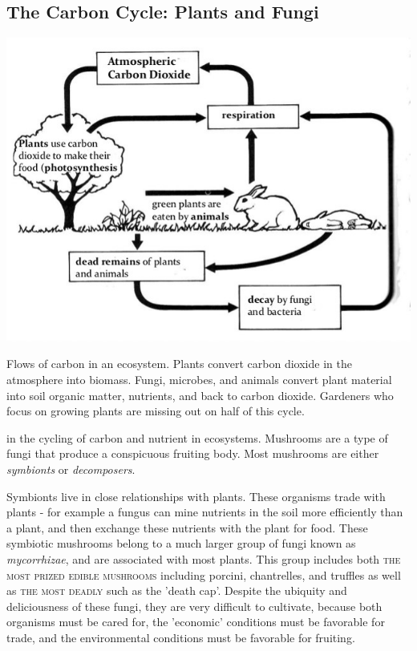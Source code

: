 \documentclass{tufte-handout}
\begin{document}
\subsection{The Carbon Cycle: Plants and Fungi}

\begin{marginfigure}
\includegraphics{figures/c-cycle.jpg}
\caption{Flows of carbon in an ecosystem.
Plants convert carbon dioxide in the atmosphere into biomass. Fungi, microbes, and animals convert plant material into soil organic matter, nutrients, and back to carbon dioxide.
Gardeners who focus on growing plants are missing out on half of this cycle.}
\end{marginfigure}

 in the cycling of carbon and nutrient in ecosystems. Mushrooms are a type of fungi that produce a conspicuous 
fruiting body. Most mushrooms are either \emph{symbionts} or \emph{decomposers}.

Symbionts live in close relationships with plants. 
These organisms trade with plants - for example a fungus can mine nutrients in the soil more efficiently than a plant, and then exchange these nutrients with the plant for food.
These symbiotic mushrooms belong to a much larger group of fungi known as \emph{mycorrhizae}, and are associated with most plants. This group includes both \textsc{the most prized edible mushrooms} including porcini, chantrelles, and truffles as well as \textsc{the most deadly} such as the 'death cap'. 
Despite the ubiquity and deliciousness of these fungi, they are very difficult to cultivate, because both organisms must be cared for, the 'economic' conditions must be favorable for trade, and the environmental conditions must be favorable for fruiting.
\end{document}
